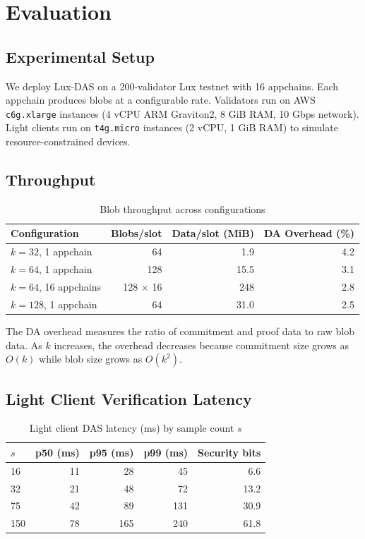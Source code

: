 \section{Evaluation}

\label{sec:evaluation}

\subsection{Experimental Setup}

We deploy Lux-DAS on a 200-validator Lux testnet with 16 appchains. Each appchain produces
blobs at a configurable rate. Validators run on AWS \texttt{c6g.xlarge} instances (4 vCPU
ARM Graviton2, 8 GiB RAM, 10 Gbps network). Light clients run on \texttt{t4g.micro} instances
(2 vCPU, 1 GiB RAM) to simulate resource-constrained devices.

\subsection{Throughput}

\begin{table}[H]
\centering
\caption{Blob throughput across configurations}
\label{tab:throughput}
\begin{tabular}{lrrr}
\toprule
\textbf{Configuration} & \textbf{Blobs/slot} & \textbf{Data/slot (MiB)} & \textbf{DA Overhead (\%)} \\
\midrule
$k=32$, 1 appchain & 64 & 1.9 & 4.2 \\
$k=64$, 1 appchain & 128 & 15.5 & 3.1 \\
$k=64$, 16 appchains & 128 $\times$ 16 & 248 & 2.8 \\
$k=128$, 1 appchain & 64 & 31.0 & 2.5 \\
\bottomrule
\end{tabular}
\end{table}

The DA overhead measures the ratio of commitment and proof data to raw blob data. As $k$
increases, the overhead decreases because commitment size grows as $O(k)$ while blob size
grows as $O(k^2)$.

\subsection{Light Client Verification Latency}

\begin{table}[H]
\centering
\caption{Light client DAS latency (ms) by sample count $s$}
\label{tab:light-client-latency}
\begin{tabular}{lrrrr}
\toprule
\textbf{$s$} & \textbf{p50 (ms)} & \textbf{p95 (ms)} & \textbf{p99 (ms)} & \textbf{Security bits} \\
\midrule
16 & 11 & 28 & 45 & 6.6 \\
32 & 21 & 48 & 72 & 13.2 \\
75 & 42 & 89 & 131 & 30.9 \\
150 & 78 & 165 & 240 & 61.8 \\
\bottomrule
\end{tabular}
\end{table}

